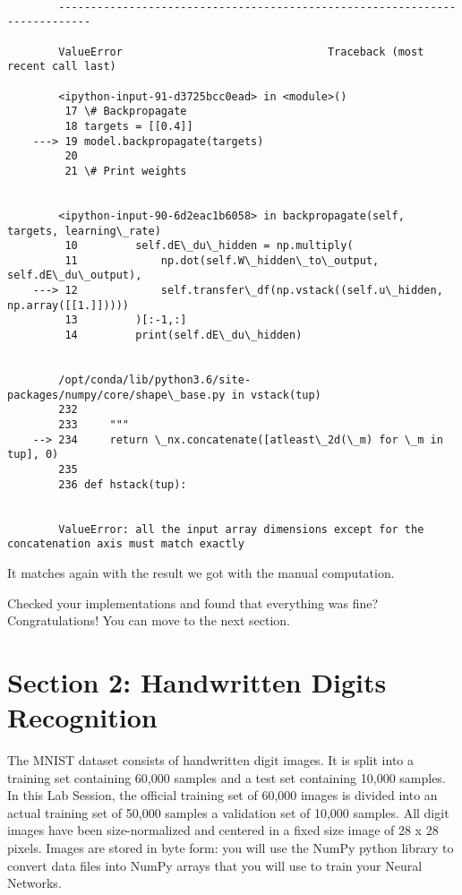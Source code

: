 \documentclass[11pt]{article}
\begin{document}
    \begin{Verbatim}[commandchars=\\\{\}]

        ---------------------------------------------------------------------------

        ValueError                                Traceback (most recent call last)

        <ipython-input-91-d3725bcc0ead> in <module>()
         17 \# Backpropagate
         18 targets = [[0.4]]
    ---> 19 model.backpropagate(targets)
         20 
         21 \# Print weights


        <ipython-input-90-6d2eac1b6058> in backpropagate(self, targets, learning\_rate)
         10         self.dE\_du\_hidden = np.multiply(
         11             np.dot(self.W\_hidden\_to\_output, self.dE\_du\_output),
    ---> 12             self.transfer\_df(np.vstack((self.u\_hidden, np.array([[1.]]))))
         13         )[:-1,:]
         14         print(self.dE\_du\_hidden)


        /opt/conda/lib/python3.6/site-packages/numpy/core/shape\_base.py in vstack(tup)
        232 
        233     """
    --> 234     return \_nx.concatenate([atleast\_2d(\_m) for \_m in tup], 0)
        235 
        236 def hstack(tup):


        ValueError: all the input array dimensions except for the concatenation axis must match exactly

    \end{Verbatim}

    It matches again with the result we got with the manual computation.

    Checked your implementations and found that everything was fine?
Congratulations! You can move to the next section.

    \section{Section 2: Handwritten Digits
Recognition}\label{section-2-handwritten-digits-recognition}

    The MNIST dataset consists of handwritten digit images. It is split into
a training set containing 60,000 samples and a test set containing
10,000 samples. In this Lab Session, the official training set of 60,000
images is divided into an actual training set of 50,000 samples a
validation set of 10,000 samples. All digit images have been
size-normalized and centered in a fixed size image of 28 x 28 pixels.
Images are stored in byte form: you will use the NumPy python library to
convert data files into NumPy arrays that you will use to train your
Neural Networks.
\end{document}
